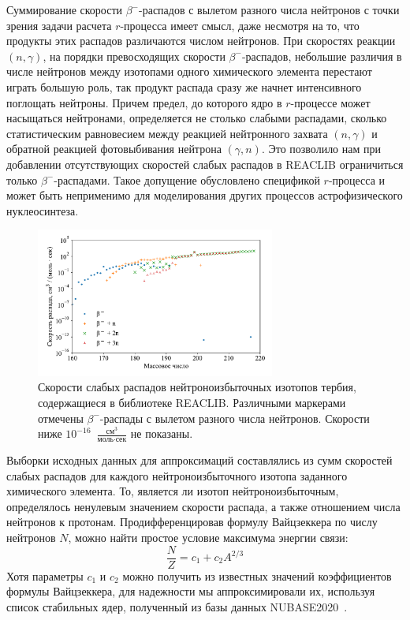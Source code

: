   Суммирование скорости $\beta^-$-распадов с вылетом разного числа нейтронов с точки зрения задачи расчета $r$-процесса имеет смысл, даже несмотря на то, что продукты этих распадов различаются числом нейтронов. При скоростях реакции $(n,\gamma)$, на порядки превосходящих скорости $\beta^-$-распадов, небольшие различия в числе нейтронов между изотопами одного химического элемента перестают играть большую роль, так продукт распада сразу же начнет интенсивного поглощать нейтроны. Причем предел, до которого ядро в $r$-процессе может насыщаться нейтронами, определяется не столько слабыми распадами, сколько статистическим равновесием между реакцией нейтронного захвата $(n,\gamma)$ и обратной реакцией фотовыбивания нейтрона $(\gamma,n)$. Это позволило нам при добавлении отсутствующих скоростей слабых распадов в REACLIB ограничиться только $\beta^-$-распадами. Такое допущение обусловлено спецификой $r$-процесса и может быть неприменимо для моделирования других процессов астрофизического нуклеосинтеза. 

\begin{figure}
  \centering
  \includegraphics[width=0.7\textwidth]{pics/decays_tb.pdf}
  \caption{Скорости слабых распадов нейтроноизбыточных изотопов тербия, содержащиеся в библиотеке REACLIB. Различными маркерами отмечены $\beta^-$-распады с вылетом разного числа нейтронов. Скорости ниже $10^{-16}$~$\frac{\text{см}^3}{\text{моль}\cdot\text{сек}}$ не показаны.}
  \label{img:decays_tb}
\end{figure}

  Выборки исходных данных для аппроксимаций составлялись из сумм скоростей слабых распадов для каждого нейтроноизбыточного изотопа заданного химического элемента. То, является ли изотоп нейтроноизбыточным, определялось ненулевым значением скорости распада, а также отношением числа нейтронов к протонам. Продифференцировав формулу Вайцзеккера по числу нейтронов $N$, можно найти простое условие максимума энергии связи:
\begin{equation}
  \displaystyle
  \frac{N}{Z} = c_1 + c_2 A^{2/3}
  \label{eq:nzratio}
\end{equation}
Хотя параметры $c_1$ и $c_2$ можно получить из известных значений коэффициентов формулы Вайцзеккера, для надежности мы аппроксимировали их, используя список стабильных ядер, полученный из базы данных NUBASE2020~\cite{kondev2021}.
  

